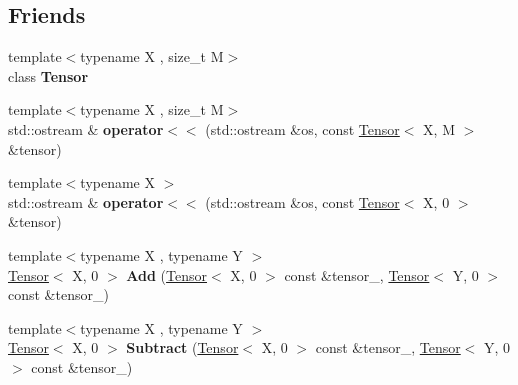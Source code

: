 \subsection*{Friends}
\begin{DoxyCompactItemize}
\item 
{\footnotesize template$<$typename X , size\+\_\+t M$>$ }\\class {\bfseries Tensor}\hypertarget{classtensor_1_1Tensor_3_01T_00_010_01_4_af4a07134de1525172d3c60c57e8f1496}{}\label{classtensor_1_1Tensor_3_01T_00_010_01_4_af4a07134de1525172d3c60c57e8f1496}

\item 
{\footnotesize template$<$typename X , size\+\_\+t M$>$ }\\std\+::ostream \& {\bfseries operator$<$$<$} (std\+::ostream \&os, const \hyperlink{classtensor_1_1Tensor}{Tensor}$<$ X, M $>$ \&tensor)\hypertarget{classtensor_1_1Tensor_3_01T_00_010_01_4_a604769864add641c2cb711a392fb919b}{}\label{classtensor_1_1Tensor_3_01T_00_010_01_4_a604769864add641c2cb711a392fb919b}

\item 
{\footnotesize template$<$typename X $>$ }\\std\+::ostream \& {\bfseries operator$<$$<$} (std\+::ostream \&os, const \hyperlink{classtensor_1_1Tensor}{Tensor}$<$ X, 0 $>$ \&tensor)\hypertarget{classtensor_1_1Tensor_3_01T_00_010_01_4_aed20dec24b3a76be5682041b5875abec}{}\label{classtensor_1_1Tensor_3_01T_00_010_01_4_aed20dec24b3a76be5682041b5875abec}

\item 
{\footnotesize template$<$typename X , typename Y $>$ }\\\hyperlink{classtensor_1_1Tensor}{Tensor}$<$ X, 0 $>$ {\bfseries Add} (\hyperlink{classtensor_1_1Tensor}{Tensor}$<$ X, 0 $>$ const \&tensor\+\_, \hyperlink{classtensor_1_1Tensor}{Tensor}$<$ Y, 0 $>$ const \&tensor\+\_)\hypertarget{classtensor_1_1Tensor_3_01T_00_010_01_4_acd0304069c176583e8039159a4b70045}{}\label{classtensor_1_1Tensor_3_01T_00_010_01_4_acd0304069c176583e8039159a4b70045}

\item 
{\footnotesize template$<$typename X , typename Y $>$ }\\\hyperlink{classtensor_1_1Tensor}{Tensor}$<$ X, 0 $>$ {\bfseries Subtract} (\hyperlink{classtensor_1_1Tensor}{Tensor}$<$ X, 0 $>$ const \&tensor\+\_, \hyperlink{classtensor_1_1Tensor}{Tensor}$<$ Y, 0 $>$ const \&tensor\+\_)\hypertarget{classtensor_1_1Tensor_3_01T_00_010_01_4_a5fb57460835d310157741277aefb32ab}{}\label{classtensor_1_1Tensor_3_01T_00_010_01_4_a5fb57460835d310157741277aefb32ab}


\end{DoxyCompactItemize}
